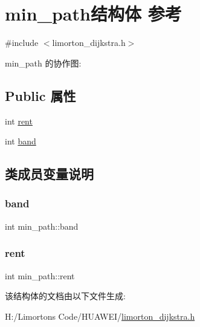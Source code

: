 \hypertarget{structmin__path}{}\section{min\+\_\+path结构体 参考}
\label{structmin__path}


{\ttfamily \#include $<$limorton\+\_\+dijkstra.\+h$>$}



min\+\_\+path 的协作图\+:
\subsection*{Public 属性}
\begin{DoxyCompactItemize}
\item 
int \hyperlink{structmin__path_a36534ef9e981ca299e37493de8ddedde}{rent}
\item 
int \hyperlink{structmin__path_a7ca19beeed25e4279478224fae8ebba4}{band}
\end{DoxyCompactItemize}


\subsection{类成员变量说明}
\mbox{\label{structmin__path_a7ca19beeed25e4279478224fae8ebba4}} 
\subsubsection{\texorpdfstring{band}{band}}
{\footnotesize\ttfamily int min\+\_\+path\+::band}

\mbox{\label{structmin__path_a36534ef9e981ca299e37493de8ddedde}} 
\subsubsection{\texorpdfstring{rent}{rent}}
{\footnotesize\ttfamily int min\+\_\+path\+::rent}



该结构体的文档由以下文件生成\+:\begin{DoxyCompactItemize}
\item 
H\+:/\+Limorton\textquotesingle{}s Code/\+H\+U\+A\+W\+E\+I/\hyperlink{limorton__dijkstra_8h}{limorton\+\_\+dijkstra.\+h}\end{DoxyCompactItemize}

